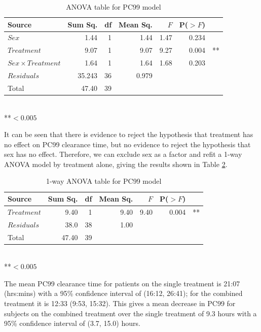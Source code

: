 \begin{table}[h]
\centering
\caption{ANOVA table for PC99 model}\label{aov99}
\begin{tabular}{l|rrrrrl}
Source&Sum Sq.&df&Mean Sq.&$F$&P($>F$)\\
\hline
$Sex$				& 1.44 & 1 & 1.44 & 1.47 & 0.234 & \\
$Treatment$			& 9.07   & 1 & 9.07   & 9.27   & 0.004 &** \\
$Sex\times Treatment$	& 1.64   & 1 & 1.64   & 1.68   & 0.203 & \\
$Residuals$			& 35.243 & 36 & 0.979 &&&\\
\hline
Total&47.40&39&&&
\end{tabular}\\
**$<0.005$
\end{table}

It can be seen that there is evidence to reject the hypothesis that treatment has no effect on PC99 clearance time, but no evidence to reject the hypothesis that sex has no effect. Therefore, we can exclude sex as a factor and refit a 1-way ANOVA model by treatment alone, giving the results shown in Table \ref{aov99r}.
\begin{table}[h]
\centering
\caption{1-way ANOVA table for PC99 model}\label{aov99r}
\begin{tabular}{l|rrrrrl}
Source&Sum Sq.&df&Mean Sq.&$F$&P($>F$)\\
\hline
$Treatment$			& 9.40   & 1 & 9.40   & 9.40   & 0.004 &** \\
$Residuals$			& 38.0 & 38 & 1.00 &&&\\
\hline
Total&47.40&39&&&
\end{tabular}\\
**$<0.005$
\end{table}

The mean PC99 clearance time for patients on the single treatment is 21:07 (hrs:mins) with a 95\% confidence interval of (16:12, 26:41); for the combined treatment it is 12:33 (9:53, 15:32). This gives a mean decrease in PC99 for subjects on the combined treatment over the single treatment of 9.3 hours with a 95\% confidence interval of (3.7, 15.0) hours.

